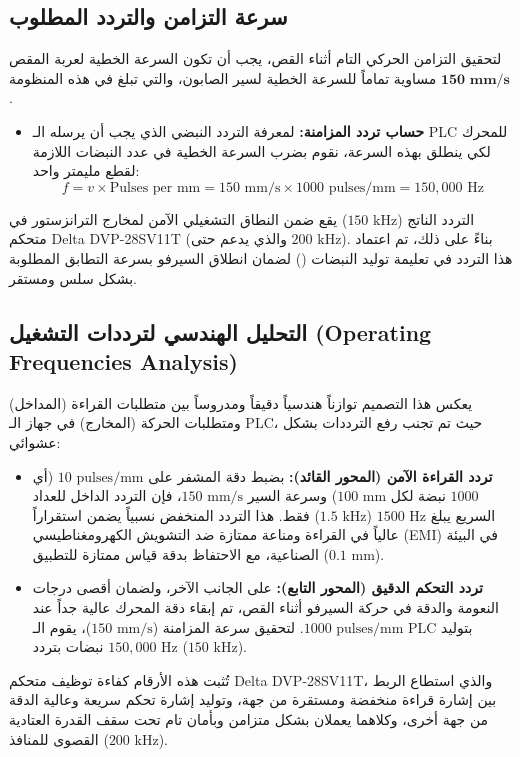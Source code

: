 \subsection{سرعة التزامن والتردد المطلوب}
لتحقيق التزامن الحركي التام أثناء القص، يجب أن تكون السرعة الخطية لعربة المقص مساوية تماماً للسرعة الخطية لسير الصابون، والتي تبلغ في هذه المنظومة $\mathbf{150\text{ mm/s}}$.
\begin{itemize}
    \item \textbf{حساب تردد المزامنة:} لمعرفة التردد النبضي الذي يجب أن يرسله الـ \textenglish{PLC} للمحرك لكي ينطلق بهذه السرعة، نقوم بضرب السرعة الخطية في عدد النبضات اللازمة لقطع مليمتر واحد:
    $$f = v \times \text{Pulses per mm} = 150\text{ mm/s} \times 1000\text{ pulses/mm} = 150,000\text{ Hz}$$
\end{itemize}

التردد الناتج ($150\text{ kHz}$) يقع ضمن النطاق التشغيلي الآمن لمخارج الترانزستور في متحكم \textenglish{Delta DVP-28SV11T} (والذي يدعم حتى $200\text{ kHz}$). بناءً على ذلك، تم اعتماد هذا التردد في تعليمة توليد النبضات () لضمان انطلاق السيرفو بسرعة التطابق المطلوبة بشكل سلس ومستقر.

\subsection{التحليل الهندسي لترددات التشغيل \textenglish{(Operating Frequencies Analysis)}}
يعكس هذا التصميم توازناً هندسياً دقيقاً ومدروساً بين متطلبات القراءة (المداخل) ومتطلبات الحركة (المخارج) في جهاز الـ \textenglish{PLC}، حيث تم تجنب رفع الترددات بشكل عشوائي:

\begin{itemize}
    \item \textbf{تردد القراءة الآمن (المحور القائد):} بضبط دقة المشفر على $10\text{ pulses/mm}$ (أي $1000$ نبضة لكل $100\text{ mm}$) وسرعة السير $150\text{ mm/s}$، فإن التردد الداخل للعداد السريع يبلغ $1500\text{ Hz}$ ($1.5\text{ kHz}$) فقط. هذا التردد المنخفض نسبياً يضمن استقراراً عالياً في القراءة ومناعة ممتازة ضد التشويش الكهرومغناطيسي \textenglish{(EMI)} في البيئة الصناعية، مع الاحتفاظ بدقة قياس ممتازة للتطبيق ($0.1\text{ mm}$).
    
    \item \textbf{تردد التحكم الدقيق (المحور التابع):} على الجانب الآخر، ولضمان أقصى درجات النعومة والدقة في حركة السيرفو أثناء القص، تم إبقاء دقة المحرك عالية جداً عند $1000\text{ pulses/mm}$. لتحقيق سرعة المزامنة ($150\text{ mm/s}$)، يقوم الـ \textenglish{PLC} بتوليد نبضات بتردد $150,000\text{ Hz}$ ($150\text{ kHz}$).
\end{itemize}

تُثبت هذه الأرقام كفاءة توظيف متحكم \textenglish{Delta DVP-28SV11T}، والذي استطاع الربط بين إشارة قراءة منخفضة ومستقرة من جهة، وتوليد إشارة تحكم سريعة وعالية الدقة من جهة أخرى، وكلاهما يعملان بشكل متزامن وبأمان تام تحت سقف القدرة العتادية القصوى للمنافذ ($200\text{ kHz}$).